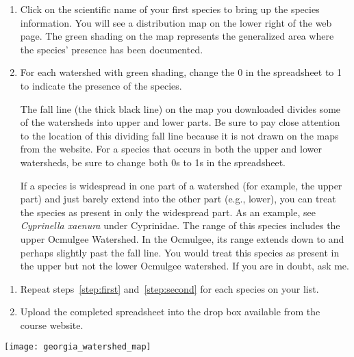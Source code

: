 \documentclass[12pt]{exam}
\begin{document}
\begin{enumerate}
\item\label{step:first}
  Click on the scientific name of your first species to bring up 
  the species information. You will see a distribution map on the 
  lower right of the web page. The green shading on the map 
  represents the generalized area where the species' presence has 
  been documented.
\item\label{step:second}
  For each watershed with green shading, change the 0 in the 
  spreadsheet to 1 to indicate the presence of the species.

The fall line (the thick black line) on the map you downloaded 
divides some of the watersheds into upper and lower parts. Be 
sure to pay close attention to the location of this dividing fall 
line because it is not drawn on the maps from the website. For a 
species that occurs in both the upper and lower watersheds, be 
sure to change both 0s to 1s in the spreadsheet.

If a species is widespread in one part of a watershed (for 
example, the upper part) and just barely extend into the other 
part (e.g., lower), you can treat the species as present in only 
the widespread part. As an example, see \emph{Cyprinella xaenura} 
under Cyprinidae. The range of this species includes the upper 
Ocmulgee Watershed. In the Ocmulgee, its range extends down to 
and perhaps slightly past the fall line. You would treat this 
species as present in the upper but not the lower Ocmulgee 
watershed. If you are in doubt, ask me.

\end{enumerate}


\begin{enumerate}[resume]
\item
  Repeat steps~\ref{step:first} and~\ref{step:second} for each species on your list.
\item
  Upload the completed spreadsheet into the drop box available 
  from the course website.
\end{enumerate}
\newpage

\texttt{[image: georgia\_watershed\_map]}
\end{document}
